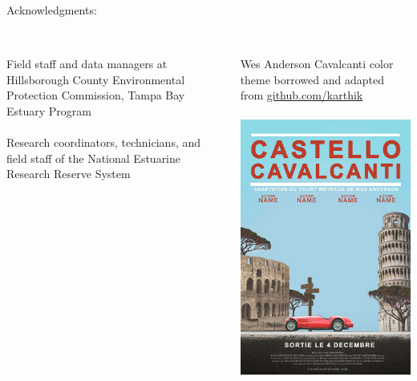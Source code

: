 \documentclass[serif]{beamer}\usepackage[]{graphicx}\usepackage[]{color}
\begin{document}
\begin{frame}
Acknowledgments:\\~\\
\begin{columns}
\begin{column}{0.6\textwidth}
{\footnotesize
Field staff and data managers at Hillsborough County Environmental Protection Commission, Tampa Bay Estuary Program\\~\\
Research coordinators, technicians, and field staff of the National Estuarine Research Reserve System}\\~\\
\end{column}
\begin{column}{0.3\textwidth}
\vspace{-0.2in}
\begin{center}
{\tiny
Wes Anderson Cavalcanti color theme borrowed and adapted from \href{https://github.com/karthik/wesanderson}{github.com/karthik}\\~\\
\includegraphics[width=0.55\linewidth]{fig/cavalcanti.jpg}\\~\\
\vspace{-0.15in}
}
\end{center}
\end{column}
\end{columns}

\end{frame}
\end{document}
